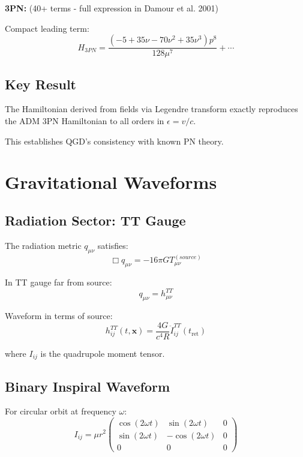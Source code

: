 \documentclass[11pt,a4paper]{article}
\theoremstyle{definition}
\theoremstyle{remark}
\begin{document}
	\textbf{3PN:} (40+ terms - full expression in Damour et al. 2001)
	
	Compact leading term:
	\begin{equation}
		H_{3PN} = \frac{(-5+35\nu-70\nu^2+35\nu^3)p^8}{128\mu^7} + \cdots
	\end{equation}
	
	\subsection{Key Result}
	
		The Hamiltonian derived from fields via Legendre transform exactly reproduces the ADM 3PN Hamiltonian to all orders in $\epsilon = v/c$.
	
	This establishes QGD's consistency with known PN theory.
	
	\section{Gravitational Waveforms}
	
	\subsection{Radiation Sector: TT Gauge}
	
	The radiation metric $q_{\mu\nu}$ satisfies:
	\begin{equation}
		\Box q_{\mu\nu} = -16\pi G T_{\mu\nu}^{(source)}
	\end{equation}
	
	In TT gauge far from source:
	\begin{equation}
		q_{\mu\nu} = h_{\mu\nu}^{TT}
	\end{equation}
	
	Waveform in terms of source:
	\begin{equation}
		h_{ij}^{TT}(t,\mathbf{x}) = \frac{4G}{c^4 R}\ddot{I}_{ij}^{TT}(t_{\text{ret}})
	\end{equation}
	
	where $I_{ij}$ is the quadrupole moment tensor.
	
	\subsection{Binary Inspiral Waveform}
	
	For circular orbit at frequency $\omega$:
	\begin{equation}
		I_{ij} = \mu r^2\left(\begin{matrix}
			\cos(2\omega t) & \sin(2\omega t) & 0\\
			\sin(2\omega t) & -\cos(2\omega t) & 0\\
			0 & 0 & 0
		\end{matrix}\right)
	\end{equation}
	
\end{document}
